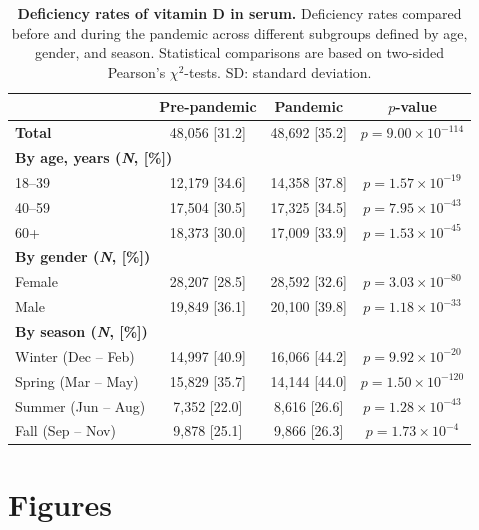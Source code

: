 \documentclass[12pt]{article}
\begin{document}
\vspace{0.4cm}
\begin{table}[h]
    \centering
\caption{\textbf{Deficiency rates of vitamin D in serum.} Deficiency rates compared before and during the pandemic across different subgroups defined by age, gender, and season. Statistical comparisons are based on two-sided Pearson's $\chi^2$-tests. SD: standard deviation.}
\label{tab:results_stat_deficiency_rate}
    \begin{tabular}{|l|c|c|c|}
    \hline
    \rowcolor{orange!20} & \textbf{Pre-pandemic} & \textbf{Pandemic} & \textbf{$p$-value}\\ \hline 
    \textbf{Total}& 48,056 [31.2]& 48,692 [35.2]& $p = 9.00 \times 10^{-114}$\\\hline
    \multicolumn{4}{|l|}{ \textbf{By age, years (\textit{N}, [\%])} } \\\hline
    18--39 & 12,179 [34.6]& 14,358 [37.8]& $p = 1.57 \times 10^{-19}$\\ \hline
    40--59 & 17,504 [30.5]& 17,325 [34.5]& $p = 7.95 \times 10^{-43}$\\ \hline
    60+ & 18,373 [30.0]& 17,009 [33.9]& $p = 1.53 \times 10^{-45}$\\ \hline
    \multicolumn{4}{|l|}{ \textbf{By gender (\textit{N}, [\%])} } \\ \hline
    Female& 28,207 [28.5]& 28,592 [32.6]& $p = 3.03 \times 10^{-80}$\\ \hline
    Male& 19,849 [36.1]& 20,100 [39.8]& $p = 1.18 \times 10^{-33}$\\ \hline
 \multicolumn{4}{|l|}{ \textbf{By season (\textit{N}, [\%])} } \\ \hline 
 Winter (Dec -- Feb)& 14,997 [40.9]& 16,066 [44.2]&$p = 9.92 \times 10^{-20}$\\ \hline 
 Spring (Mar -- May)& 15,829 [35.7]& 14,144 [44.0]&$p = 1.50 \times 10^{-120}$\\ \hline 
 Summer (Jun -- Aug)& 7,352 [22.0]& 8,616 [26.6]&$p = 1.28 \times 10^{-43}$\\ \hline 
 Fall (Sep -- Nov)& 9,878 [25.1]& 9,866 [26.3]&$p = 1.73 \times 10^{-4}$\\ \hline
\end{tabular}
\end{table}


\newpage
\clearpage   


\section*{Figures}
\end{document}
